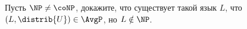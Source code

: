 Пусть $\NP \neq \coNP$, докажите, что существует такой язык $L$, что $(L, \distrib{U}) \in \AvgP$, но
$L \notin \NP$.
